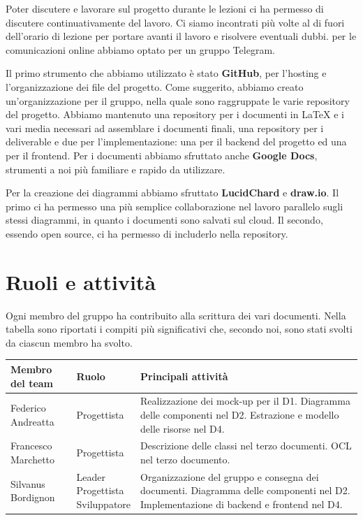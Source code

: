 \documentclass[a4paper,12pt]{article}
\begin{document}
Poter discutere e lavorare sul progetto durante le lezioni ci ha permesso di discutere continuativamente del lavoro. Ci siamo incontrati più volte al di fuori dell'orario di lezione per portare avanti il lavoro e risolvere eventuali dubbi. per le comunicazioni online abbiamo optato per un gruppo Telegram.

Il primo strumento che abbiamo utilizzato è stato \textbf{GitHub}, per l'hosting e l'organizzazione dei file del progetto. Come suggerito, abbiamo creato un'organizzazione per il gruppo, nella quale sono raggruppate le varie repository del progetto. Abbiamo mantenuto una repository per i documenti in LaTeX e i vari media necessari ad assemblare i documenti finali, una repository per i deliverable e due per l'implementazione: una per il backend del progetto ed una per il frontend. Per i documenti abbiamo sfruttato anche \textbf{Google Docs}, strumenti a noi più familiare e rapido da utilizzare.

Per la creazione dei diagrammi abbiamo sfruttato \textbf{LucidChard} e \textbf{draw.io}. Il primo ci ha permesso una più semplice collaborazione nel lavoro parallelo sugli stessi diagrammi, in quanto i documenti sono salvati sul cloud. Il secondo, essendo open source, ci ha permesso di includerlo nella repository.

\section{Ruoli e attività}

Ogni membro del gruppo ha contribuito alla scrittura dei vari documenti. Nella tabella sono riportati i compiti più significativi che, secondo noi, sono stati svolti da ciascun membro ha svolto.


\begin{tabular}{|p{4cm}|p{2.4cm}|p{8cm}|}
    \hline
    \textbf{Membro del team} & \textbf{Ruolo} & \textbf{Principali attività} \\ \hline
    Federico Andreatta & Progettista & Realizzazione dei mock-up per il D1. Diagramma delle componenti nel D2. Estrazione e modello delle risorse nel D4. \\ \hline
    Francesco Marchetto & Progettista & Descrizione delle classi nel terzo documenti. OCL nel terzo documento. \\ \hline
    Silvanus Bordignon & \makecell[l]{Leader \\ Progettista \\ Sviluppatore} & Organizzazione del gruppo e consegna dei documenti. Diagramma delle componenti nel D2. Implementazione di backend e frontend nel D4. \\ \hline
\end{tabular}
\end{document}

